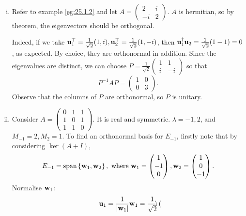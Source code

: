 \documentclass[10pt]{article}
\def\i{{\mathrm i}}
\begin{document}
    \begin{example}
        \begin{enumerate}[(i)]
            \item Refer to example \ref{eg:25.1.2} and let $ A = \begin{pmatrix}
                2&i\\-i&2
            \end{pmatrix} $. $A$ is hermitian, so by theorem, the eigenvectors should be orthogonal.

            Indeed, if we take $ {\bf u}_1^{\top}=\frac{1}{\sqrt{2}}(1,i), {\bf u}_2^{\top}=\frac{1}{\sqrt{2}}(1,-i) $, then $ {\bf u}_1^\dagger {\bf u}_2=\frac{1}{\sqrt{2}}(1-1)=0 $, as expected. By choice, they are orthonormal in addition. Since the eigenvalues are distinct, we can choose $ \displaystyle P = \frac{1}{\sqrt{2}}\begin{pmatrix}
                1&1\\i&-i
            \end{pmatrix} $ so that 
            \[
                P^{-1}AP=\begin{pmatrix}
                    1&0\\
                    0&3
                \end{pmatrix}.
            \]
            Observe that the columns of $P$ are orthonormal, so $P$ is unitary.
            \item Consider $ A = \begin{pmatrix}
                0&1&1\\
                1&0&1\\
                1&1&0
            \end{pmatrix} $. It is real and symmetric. $ \lambda=-1,2 $, and $ M_{-1}=2, M_{2}=1 $. To find an orthonormal basis for $ E_{-1} $, firstly note that by considering $ \ker (A+I) $, 
            \[
                E_{-1}=\operatorname{span}\left\{ {\bf w}_1,{\bf w}_2 \right\}, \text{ where } {\bf w}_1=\begin{pmatrix}
                    1\\-1\\0
                \end{pmatrix}, {\bf w}_2=\begin{pmatrix}
                    1\\0\\-1
                \end{pmatrix}.
            \]
            Normalise ${\bf w}_1$:
            \[
                {\bf u}_1=\frac{1}{|{\bf w}_1|}{\bf w}_1=\frac{1}{\sqrt{2}}\begin{pmatrix}

\end{pmatrix}\]
\end{enumerate}
\end{example}
\end{document}
